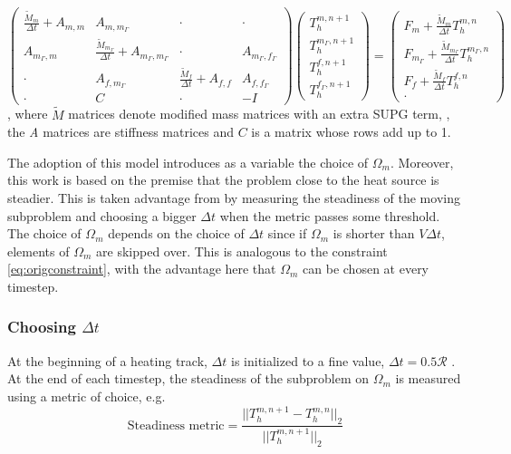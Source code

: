 \begin{equation}\label{eq:algebraic_coupled}
  \begin{pmatrix}
    \frac{\tilde{M}_m}{\Delta t} + A_{m, m} & A_{m, m_\Gamma} & \cdot & \cdot \\[3mm]
    A_{m_\Gamma, m} & \frac{\tilde{M}_{m_\Gamma}}{\Delta t} + A_{m_\Gamma, m_\Gamma} & \cdot & A_{m_\Gamma, f_\Gamma}  \\[3mm]
    \cdot & A_{f, m_\Gamma} & \frac{\tilde{M}_{f}}{\Delta t}  + A_{f, f} & A_{f, f_\Gamma}  \\[3mm]
    \cdot & C & \cdot & -I
  \end{pmatrix}
  \begin{pmatrix}
    T_h^{m, n+1}          \\[3mm]
    T_h^{m_\Gamma, n+1} \\[3mm]
    T_h^{f, n+1}          \\[3mm]
    T_h^{f_\Gamma, n+1}
  \end{pmatrix}
  =
  \begin{pmatrix}
    F_m          + \frac{\tilde{M}_m}{\Delta t} T_h^{m, n}\\[3mm]
    F_{m_\Gamma} + \frac{\tilde{M}_{m_\Gamma}}{\Delta t} T_h^{m_\Gamma, n}\\[3mm]
    F_{f}        + \frac{\tilde{M}_{f}}{\Delta t} T_h^{f,n}\\[3mm]
    \cdot
  \end{pmatrix}
\end{equation}
, where $\tilde{M}$ matrices denote modified mass matrices with
an extra SUPG term, , the \textit{A} matrices are stiffness
matrices and $C$ is a matrix whose rows add up to 1.\par

The adoption of this model introduces as a variable
the choice of $\Omega_m$. Moreover,
this work is based on the premise that
the problem close to the heat source is steadier.
This is taken advantage from by measuring
the steadiness of the moving subproblem and
choosing a bigger $\Delta t$ when the metric
passes some threshold.
The choice of $\Omega_m$ depends on the choice of
$\Delta t$ since if $\Omega_m$ is shorter than
$V \Delta t$, elements of $\Omega_m$ are skipped
over. This is analogous to the constraint \eqref{eq:origconstraint},
with the advantage here that $\Omega_m$ can be chosen at every timestep.\par

\subsubsection{Choosing \texorpdfstring{$\Delta t$}{dt}}
At the beginning of a heating track, \enskip
$\Delta t$ is initialized to a fine value,
$\Delta t = 0.5 \mathcal{R}$ .
At the end of each timestep, the steadiness
of the subproblem on $\Omega_m$ is measured 
using a metric of choice, e.g.
\begin{equation}\label{eq:steadinessmetric}
  \textrm{Steadiness metric} = \frac{||T_h^{m, n+1} - T_h^{m, n}||_2}{|| T_h^{m, n+1} ||_2}
\end{equation}

